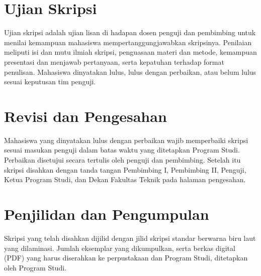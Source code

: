 \section{Ujian Skripsi}
Ujian skripsi adalah ujian lisan di hadapan dosen penguji dan pembimbing untuk menilai kemampuan mahasiswa mempertanggungjawabkan skripsinya. Penilaian meliputi isi dan mutu ilmiah skripsi, penguasaan materi dan metode, kemampuan presentasi dan menjawab pertanyaan, serta kepatuhan terhadap format penulisan. Mahasiswa dinyatakan lulus, lulus dengan perbaikan, atau belum lulus sesuai keputusan tim penguji.

\section{Revisi dan Pengesahan}
Mahasiswa yang dinyatakan lulus dengan perbaikan wajib memperbaiki skripsi sesuai masukan penguji dalam batas waktu yang ditetapkan Program Studi. Perbaikan disetujui secara tertulis oleh penguji dan pembimbing. Setelah itu skripsi disahkan dengan tanda tangan Pembimbing I, Pembimbing II, Penguji, Ketua Program Studi, dan Dekan Fakultas Teknik pada halaman pengesahan.

\section{Penjilidan dan Pengumpulan}
Skripsi yang telah disahkan dijilid dengan jilid skripsi standar berwarna biru laut yang dilaminasi. Jumlah eksemplar yang dikumpulkan, serta berkas digital (PDF) yang harus diserahkan ke perpustakaan dan Program Studi, ditetapkan oleh Program Studi.
